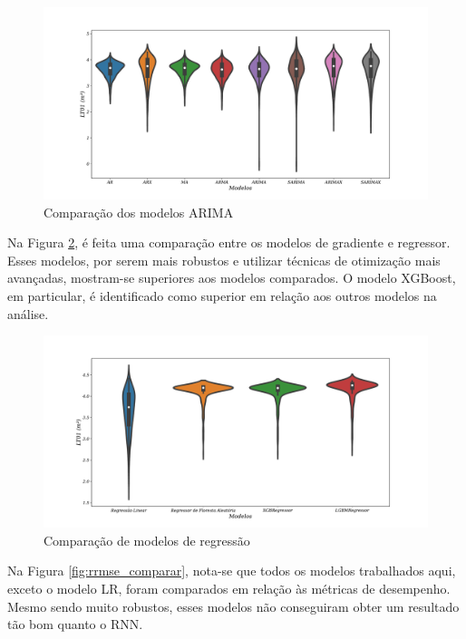 \begin{figure}[H]
	\centering
	\caption{Comparação dos modelos ARIMA}\label{fig:modelos-arima}
	\includegraphics[width=1\linewidth]{Resultados/Figuras/modelos-arima}
	

\end{figure}

Na Figura \ref{fig:violin-lr-xgb-lgbm-rf}, é feita uma comparação entre os modelos de gradiente e regressor. Esses modelos, por serem mais robustos e utilizar técnicas de otimização mais avançadas, mostram-se superiores aos modelos comparados. O modelo XGBoost, em particular, é identificado como superior em relação aos outros modelos na análise.

\begin{figure}[H]
	\centering
	\caption{Comparação de modelos de regressão}\label{fig:violin-lr-xgb-lgbm-rf}
	\includegraphics[width=1\linewidth]{Resultados/Figuras/violin-LR-XGB-LGBM-RF}
	
\end{figure}


Na Figura \ref{fig:rrmse_comparar}, nota-se que todos os modelos trabalhados aqui, exceto o modelo LR, foram comparados em relação às métricas de desempenho. Mesmo sendo muito robustos, esses modelos não conseguiram obter um resultado tão bom quanto o RNN.

